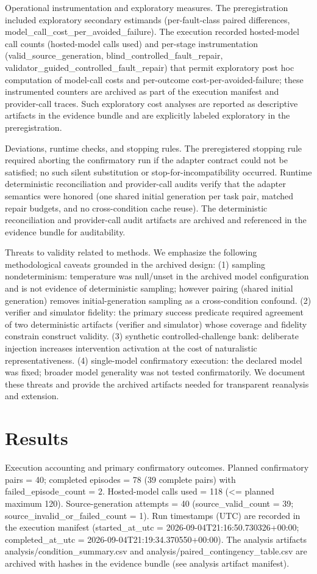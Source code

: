 \documentclass[conference]{IEEEtran}
\begin{document}
Operational instrumentation and exploratory measures. The preregistration included exploratory secondary estimands (per-fault-class paired differences, model\_call\_cost\_per\_avoided\_failure). The execution recorded hosted-model call counts (hosted-model calls used) and per-stage instrumentation (valid\_source\_generation, blind\_controlled\_fault\_repair, validator\_guided\_controlled\_fault\_repair) that permit exploratory post hoc computation of model-call costs and per-outcome cost-per-avoided-failure; these instrumented counters are archived as part of the execution manifest and provider-call traces. Such exploratory cost analyses are reported as descriptive artifacts in the evidence bundle and are explicitly labeled exploratory in the preregistration.

Deviations, runtime checks, and stopping rules. The preregistered stopping rule required aborting the confirmatory run if the adapter contract could not be satisfied; no such silent substitution or stop-for-incompatibility occurred. Runtime deterministic reconciliation and provider-call audits verify that the adapter semantics were honored (one shared initial generation per task pair, matched repair budgets, and no cross-condition cache reuse). The deterministic reconciliation and provider-call audit artifacts are archived and referenced in the evidence bundle for auditability.

Threats to validity related to methods. We emphasize the following methodological caveats grounded in the archived design: (1) sampling nondeterminism: temperature was null/unset in the archived model configuration and is not evidence of deterministic sampling; however pairing (shared initial generation) removes initial-generation sampling as a cross-condition confound. (2) verifier and simulator fidelity: the primary success predicate required agreement of two deterministic artifacts (verifier and simulator) whose coverage and fidelity constrain construct validity. (3) synthetic controlled-challenge bank: deliberate injection increases intervention activation at the cost of naturalistic representativeness. (4) single-model confirmatory execution: the declared model was fixed; broader model generality was not tested confirmatorily. We document these threats and provide the archived artifacts needed for transparent reanalysis and extension.

\section{Results}
Execution accounting and primary confirmatory outcomes. Planned confirmatory pairs = 40; completed episodes = 78 (39 complete pairs) with failed\_episode\_count = 2. Hosted-model calls used = 118 (<= planned maximum 120). Source-generation attempts = 40 (source\_valid\_count = 39; source\_invalid\_or\_failed\_count = 1). Run timestamps (UTC) are recorded in the execution manifest (started\_at\_utc = 2026-09-04T21:16:50.730326+00:00; completed\_at\_utc = 2026-09-04T21:19:34.370550+00:00). The analysis artifacts analysis/condition\_summary.csv and analysis/paired\_contingency\_table.csv are archived with hashes in the evidence bundle (see analysis artifact manifest).
\end{document}
